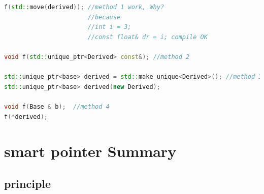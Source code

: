 \documentclass[a4paper,12pt,twoside]{book}
\begin{document}
\begin{itemize}
\begin{lstlisting}[frame=single, language=c++, mathescape=true]
f(std::move(derived)); //method 1 work, Why?
                       //because
                       //int i = 3;
                       //const float& dr = i; compile OK
                       
void f(std::unique_ptr<Derived> const&); //method 2

std::unique_ptr<base> derived = std::make_unique<Derived>(); //method 3 or
std::unique_ptr<base> derived(new Derived);

void f(Base & b);  //method 4
f(*derived);
\end{lstlisting}


\end{itemize}


\section{smart pointer Summary}

\subsection{principle}
\end{document}
